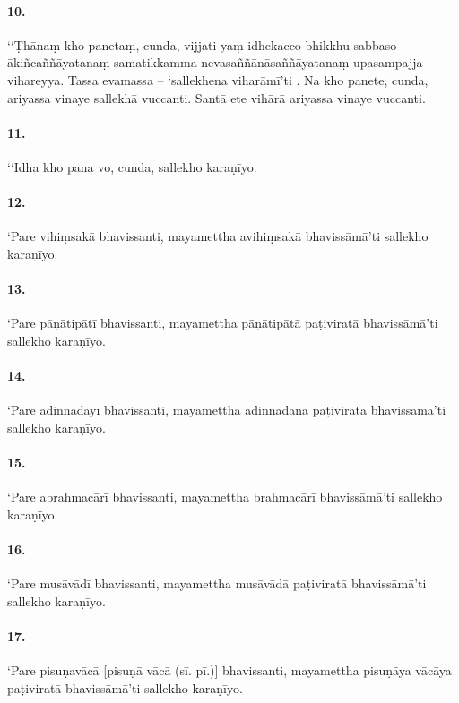 \paragraph{10.} ‘‘Ṭhānaṃ kho panetaṃ, cunda, vijjati yaṃ idhekacco bhikkhu sabbaso ākiñcaññāyatanaṃ samatikkamma nevasaññānāsaññāyatanaṃ upasampajja vihareyya. Tassa evamassa – ‘sallekhena viharāmī’ti . Na kho panete, cunda, ariyassa vinaye sallekhā vuccanti. Santā ete vihārā ariyassa vinaye vuccanti.

\paragraph{11.} ‘‘Idha kho pana vo, cunda, sallekho karaṇīyo.

\paragraph{12.} ‘Pare vihiṃsakā bhavissanti, mayamettha avihiṃsakā bhavissāmā’ti sallekho karaṇīyo.

\paragraph{13.} ‘Pare pāṇātipātī bhavissanti, mayamettha pāṇātipātā paṭiviratā bhavissāmā’ti sallekho karaṇīyo.

\paragraph{14.} ‘Pare adinnādāyī bhavissanti, mayamettha adinnādānā paṭiviratā bhavissāmā’ti sallekho karaṇīyo.

\paragraph{15.} ‘Pare abrahmacārī bhavissanti, mayamettha brahmacārī bhavissāmā’ti sallekho karaṇīyo.

\paragraph{16.} ‘Pare musāvādī bhavissanti, mayamettha musāvādā paṭiviratā bhavissāmā’ti sallekho karaṇīyo.

\paragraph{17.} ‘Pare pisuṇavācā [pisuṇā vācā (sī. pī.)] bhavissanti, mayamettha pisuṇāya vācāya paṭiviratā bhavissāmā’ti sallekho karaṇīyo.

